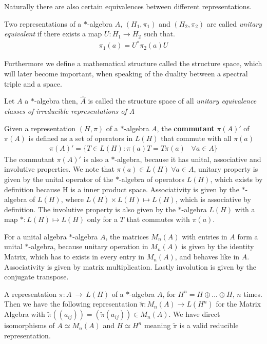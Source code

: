 Naturally there are also certain equivalences between different
representations.
\begin{definition}
Two representations of a $*$-algebra $A$, $(H_1, \pi _1)$ and
$(H_2, \pi _2)$  are called \textit{unitary equivalent} if there exists a map
$U: H_1 \rightarrow H_2$ such that.
    \begin{align}
        \pi _1(a) = U^* \pi _2(a) U
    \end{align}
\end{definition}

Furthermore we define a mathematical structure called the structure space,
which will later become important, when speaking of the duality between a spectral
triple and a space.
\begin{definition}
    Let $A$ a $*$-algebra then, $\hat{A}$ is called the structure space of all \textit{unitary equivalence classes
    of irreducible representations of A}
\end{definition}
    Given a representation $(H, \pi)$ of a $*$-algebra $A$, the \textbf{commutant} $\pi (A)'$ of $\pi (A)$ is defined as a set
    of operators in $L(H)$ that commute with all $\pi (a)$
    \begin{align}
        \pi (A)' = \{T \in L(H):\pi (a)T = T\pi (a) \;\;\; \forall a\in A\}
    \end{align}
    The commutant $\pi (A)'$ is also a $*$-algebra, because it has unital,
    associative and involutive properties.
    We note that $\pi (a) \in L(H)\ \forall a \in A$, unitary property is given
    by the unital operator of the $*$-algebra of operators $L(H)$, which exists
    by definition because H is a inner product space. Associativity is given by
    the $*$-algebra of $L(H)$, where $L(H) \times L(H) \mapsto L(H)$, which is
    associative by definition. The involutive property is also given by the $*$-algebra $L(H)$
    with a map $*: L(H) \mapsto L(H)$ only for a $T$ that commutes with $\pi (a)$.

    For a unital algebra $*$-algebra $A$, the matrices $M_n(A)$ with entries
    in $A$ form a unital $*$-algebra, because unitary operation in $M_n(A)$ is given by the identity Matrix, which
    has to exists in every entry in $M_n(A)$, and behaves like in $A$. Associativity is given by
    matrix multiplication. Lastly involution is given by the conjugate transpose.

    A representation $\pi :A\ \rightarrow \ L(H)$ of a $*$-algebra $A$, for
    $H^n = H \oplus ... \oplus H$, $n$ times.  Then we have the following
    representation $\tilde{\pi}:M_n(A) \rightarrow L(H^n)$ for the Matrix
    Algebra with $\tilde{\pi}((a_{ij})) = (\tilde{\pi}(a_{ij})) \in M_n(A)$.
    We have direct isomorphisms of $A \simeq M_n(A)$ and $H \simeq H^n$
    meaning $\tilde{\pi}$ is a valid reducible representation.

